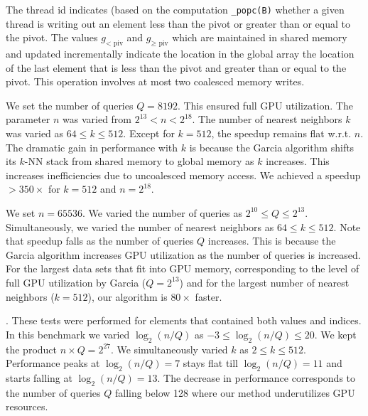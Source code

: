 \documentclass[10pt]{article}
\begin{document}
 The thread id indicates (based on the computation \texttt{\_popc(B)} whether a given thread is writing out an element less than the pivot or greater than or equal to the pivot. The values $g_{< \mbox{ piv}}$ and $g_{\ge \mbox{ piv}}$ which are maintained in shared memory and updated incrementally indicate the location in the global array the location of the last element that is less than the pivot and greater than or equal to the pivot. This operation involves at most two coalesced memory writes.

  We set the number of queries $Q=8192$. This ensured full GPU utilization. The parameter $n$ was varied from $2^{13}<n<2^{18}$. The number of nearest neighbors $k$ was varied as $64 \le k \le 512$. Except for $k=512$, the speedup remains flat w.r.t. $n$. The dramatic gain in performance with $k$ is because the Garcia algorithm shifts its $k$-NN stack from shared memory to global memory as $k$ increases. This increases inefficiencies due to uncoalesced memory access. We achieved a speedup $>350 \times$ for $k=512$ and $n=2^{18}$.

 We set $n=65536$. We varied the number of queries as $2^10 \le Q \le 2^{13}$. Simultaneously, we varied the number of nearest neighbors as $64 \le k \le 512$.  Note that speedup falls as the number of queries $Q$ increases. This is because the Garcia algorithm increases GPU utilization as the number of queries is increased. For the largest data sets that fit into GPU memory, corresponding to the level of full GPU utilization by Garcia ($Q = 2^{13}$) and for the largest number of nearest neighbors ($k=512$), our algorithm is $80 \times$ faster.

. These tests were performed for elements that contained both values and indices. In this benchmark we varied $\log_2(n/Q)$ as $-3\le \log_2(n/Q) \le 20$. We kept the product $n\times Q = 2^{27}$. We simultaneously varied $k$ as $2\le k \le 512$. Performance peaks at  $\log_2(n/Q) = 7$ stays flat till  $\log_2(n/Q) = 11$ and starts falling at  $\log_2(n/Q) = 13$. The decrease in performance corresponds to the number of queries $Q$ falling below 128 where our method underutilizes GPU resources. 
\end{document}
